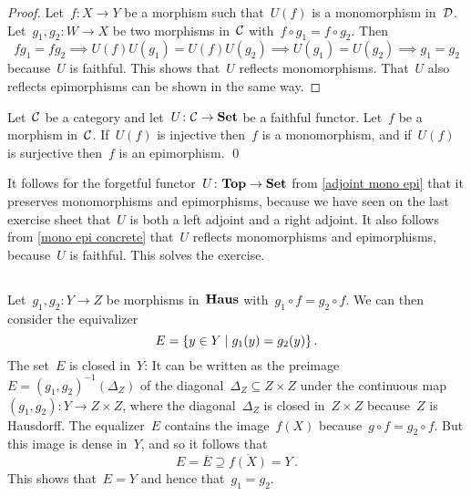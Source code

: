 \begin{proof}
  Let~$f \colon X \to Y$ be a morphism such that~$U(f)$ is a monomorphism in~$\mathcal{D}$.
  Let~$g_1, g_2 \colon W \to X$ be two morphisms in~$\mathcal{C}$ with~$f \circ g_1 = f \circ g_2$.
  Then
  \[
              f g_1 = f g_2
    \implies  U(f) U(g_1) = U(f) U(g_2)
    \implies  U(g_1) = U(g_2)
    \implies  g_1 = g_2
  \]
  because~$U$ is faithful.
  This shows that~$U$ reflects monomorphisms.
  That~$U$ also reflects epimorphisms can be shown in the same way.
\end{proof}


\begin{corollary}
  \label{mono epi concrete}
  Let~$\mathcal{C}$ be a category and let~$U \colon \mathcal{C} \to \mathbf{Set}$ be a faithful functor.
  Let~$f$ be a morphism in~$\mathcal{C}$.
  If~$U(f)$ is injective then~$f$ is a monomorphism, and if~$U(f)$ is surjective then~$f$ is an epimorphism.
  \qed
\end{corollary}


It follows for the forgetful functor~$U \colon \mathbf{Top} \to \mathbf{Set}$ from \cref{adjoint mono epi} that it preserves monomorphisms and epimorphisms, because we have seen on the last exercise sheet that~$U$ is both a left adjoint and a right adjoint.
It also follows from \cref{mono epi concrete} that~$U$ reflects monomorphisms and epimorphisms, because~$U$ is faithful.
This solves the exercise.





\subsection{}

Let~$g_1, g_2 \colon Y \to Z$ be morphisms in~$\mathbf{Haus}$ with~$g_1 \circ f = g_2 \circ f$.
We can then consider the equivalizer
\[
    E
  = \{
      y \in Y
    \suchthat
      g_1(y) = g_2(y)
    \} \,.
\]
The set~$E$ is closed in~$Y$:
It can be written as the preimage~$E = (g_1, g_2)^{-1}(\Delta_Z)$ of the diagonal~$\Delta_Z \subseteq Z \times Z$ under the continuous map~$(g_1, g_2) \colon Y \to Z \times Z$, where the diagonal~$\Delta_Z$ is closed in~$Z \times Z$ because~$Z$ is Hausdorff.
The equalizer~$E$ contains the image~$f(X)$ because~$g \circ f = g_2 \circ f$.
But this image is dense in~$Y$, and so it follows that
\[
            E
  =         \overline{E}
  \supseteq \overline{f(X)}
  =         Y \,.
\]
This shows that~$E = Y$ and hence that~$g_1 = g_2$.





